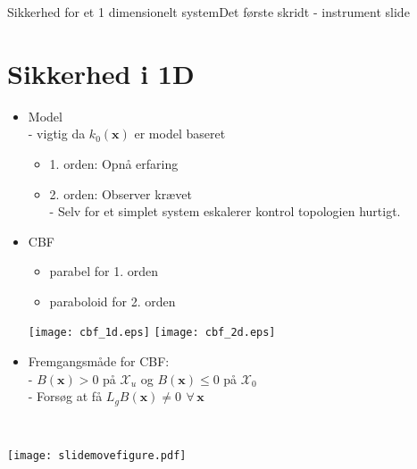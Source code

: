 \begin{frame}{Sikkerhed for et 1 dimensionelt system}{Det første skridt - instrument slide}
\section{Sikkerhed i 1D}
\vspace*{-0.5cm}
\begin{minipage}{0.6\textwidth}
\begin{block}{}
	\begin{itemize}
		\item Model \\
		\scriptsize - vigtig da $k_0(\textbf{x})$ er model baseret
		\begin{itemize}
			\item 1. orden: Opnå erfaring
			\item 2. orden: Observer krævet \\ 
			\scriptsize - Selv for et simplet system eskalerer kontrol topologien hurtigt.
		\end{itemize}	
		\item \normalsize CBF
		\begin{itemize}
			\item parabel for 1. orden
			\item paraboloid for 2. orden
		\end{itemize}
			\texttt{[image: cbf\_1d.eps]} \hspace{0.2cm}
			\texttt{[image: cbf\_2d.eps]}
		\item Fremgangsmåde for CBF: \\
		\scriptsize - $B(\textbf{x}) > 0$ på  $\mathcal{X}_u$ og  $B(\textbf{x}) \leq 0$ på  $\mathcal{X}_0$ \\
		- Forsøg at få $L_gB(\textbf{x}) \neq 0 \,\ \forall \, \textbf{x}$
	\end{itemize}
	{\color{white}{lol}}\\
	{\color{white}{lol}}
\end{block}
\vspace{-0.7cm}
\scriptsize
\end{minipage}
\hspace{0.3cm}
\vspace*{-1cm}
\begin{minipage}{0.35\textwidth}
\hspace*{-0.5cm}
\texttt{[image: slidemovefigure.pdf]}


\end{minipage}
\end{frame}
